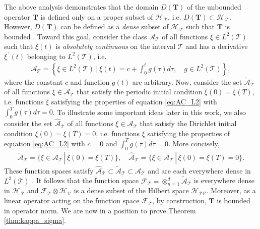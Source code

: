 \documentclass[11pt]{amsart}
\newcommand{\Tb}{\mathbf{T}}
\newcommand{\Tc}{\mathcal{T}}
\newcommand{\Vc}{\mathcal{V}}
\newcommand{\Hs}{\mathscr{H}}
\newcommand{\As}{\mathscr{A}}
\newcommand{\Fs}{\mathscr{F}}
\begin{document}
The above analysis demonstrates that the domain $D(\Tb)$ of the
unbounded operator $\Tb$ is defined only on a proper subset of $\Hs_{\,\Tc}$,
i.e. $D(\Tb)\subset\Hs_{\,\Tc}$. However, $D(\Tb)$ can be defined as a \emph{dense}
subset of $\Hs_{\,\Tc}$ such that $\Tb$ is bounded
\cite{Reed-1980,Stone:64}. Toward this goal, consider the class
$\As_{\Tc}$ of all functions $\xi\in L^2(\Tc)$ such that $\xi(t)$ is
\emph{absolutely continuous} \cite{Royden:1988:RA} on the interval
$\Tc$ and has a derivative $\xi^{\,\prime}(t)$ belonging to $L^2(\Tc)$,
i.e. \cite{Stone:64,Royden:1988:RA}   
%
\begin{align}\label{eq:AC_L2}
  \As_{\Tc}=
     \left\{
       \xi\in L^2(\Tc) \ \Big| \ \xi(t)=c+\int_0^tg(\tau)d\tau,
       \quad  g\in L^2(\Tc)
     \right\},
\end{align}
%
where the constant $c$ and function $g(t)$ are
arbitrary. Now, consider the set $\tilde{\As}_{\Tc}$ of all
functions $\xi\in\As_{\Tc}$ that satisfy the periodic initial condition
$\xi(0)=\xi(T)$, i.e. functions $\xi$ satisfying the properties of 
equation \eqref{eq:AC_L2} with $\int_0^Tg(\tau)d\tau=0$. To illustrate some
important ideas later in this work, we also consider the
set $\hat{\As}_{\Tc}$ of all functions $\xi\in\As_{\Tc}$ that satisfy the
Dirichlet initial condition $\xi(0)=\xi(T)=0$, i.e. functions $\xi$
satisfying the properties of equation \eqref{eq:AC_L2} with $c=0$ and
$\int_0^Tg(\tau)d\tau=0$. More concisely, 
%
\begin{align}\label{eq:AC_BC}
  \tilde{\As}_{\Tc}=\{\xi\in\As_{\Tc} \,|\, \xi(0)=\xi(T)\}, \quad
  \hat{\As}_{\Tc}=\{\xi\in\As_{\Tc} \,|\, \xi(0)=\xi(T)=0\}.
\end{align}
%
These function spaces satisfy
$\hat{\As}_{\Tc}\subset\tilde{\As}_{\Tc}\subset\As_{\Tc}$ and are each everywhere
dense in $L^2(\Tc)$ \cite{Stone:64}. It follows that the function space
$\Fs_{\Tc}=\otimes_{n=1}^d\tilde{\As}_{\Tc}$ is everywhere dense in
$\Hs_{\,\Tc}$ and $\Fs_{\Tc}\otimes\Hs_{\,\Vc}$ is a dense subset of the
Hilbert space $\Hs_{\Tc\Vc}$. Moreover, as a linear operator acting on
the function space $\Fs_{\Tc}$, by construction, $\Tb$ is bounded in
operator norm. We are now in a position to prove Theorem
\ref{thm:kappa_sigma}. 
\end{document}
